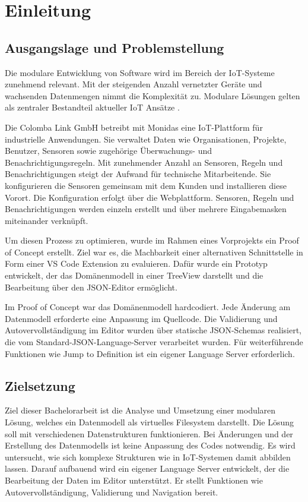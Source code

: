 \section{Einleitung}

\subsection{Ausgangslage und Problemstellung}
Die modulare Entwicklung von Software wird im Bereich der IoT-Systeme zunehmend relevant. Mit der steigenden Anzahl vernetzter Geräte und wachsenden Datenmengen nimmt die Komplexität zu. Modulare Lösungen gelten als zentraler Bestandteil aktueller IoT Ansätze \cite{IoT}.

Die Colomba Link GmbH betreibt mit Monidas eine IoT-Plattform für industrielle Anwendungen. Sie verwaltet Daten wie Organisationen, Projekte, Benutzer, Sensoren sowie zugehörige Überwachungs- und Benachrichtigungsregeln. Mit zunehmender Anzahl an Sensoren, Regeln und Benachrichtigungen steigt der Aufwand für technische Mitarbeitende. Sie konfigurieren die Sensoren gemeinsam mit dem Kunden und installieren diese Vorort. Die Konfiguration erfolgt über die Webplattform. Sensoren, Regeln und Benachrichtigungen werden einzeln erstellt und über mehrere Eingabemasken miteinander verknüpft.

Um diesen Prozess zu optimieren, wurde im Rahmen eines Vorprojekts ein Proof of Concept erstellt. Ziel war es, die Machbarkeit einer alternativen Schnittstelle in Form einer VS Code Extension zu evaluieren. Dafür wurde ein Prototyp entwickelt, der das Domänenmodell in einer TreeView darstellt und die Bearbeitung über den JSON-Editor ermöglicht.
 
Im Proof of Concept war das Domänenmodell hardcodiert. Jede Änderung am Datenmodell erforderte eine Anpassung im Quellcode. Die Validierung und Autovervollständigung im Editor wurden über statische JSON-Schemas realisiert, die vom Standard-JSON-Language-Server verarbeitet wurden. Für weiterführende Funktionen wie Jump to Definition ist ein eigener Language Server erforderlich.


\subsection{Zielsetzung}

Ziel dieser Bachelorarbeit ist die Analyse und Umsetzung einer modularen Lösung, welches ein Datenmodell als virtuelles Filesystem darstellt. Die Lösung soll mit verschiedenen Datenstrukturen funktionieren. Bei Änderungen und der Erstellung des Datenmodells ist keine Anpassung des Codes notwendig. Es wird untersucht, wie sich komplexe Strukturen wie in IoT-Systemen damit abbilden lassen. Darauf aufbauend wird ein eigener Language Server entwickelt, der die Bearbeitung der Daten im Editor unterstützt. Er stellt Funktionen wie Autovervollständigung, Validierung und Navigation bereit. 

